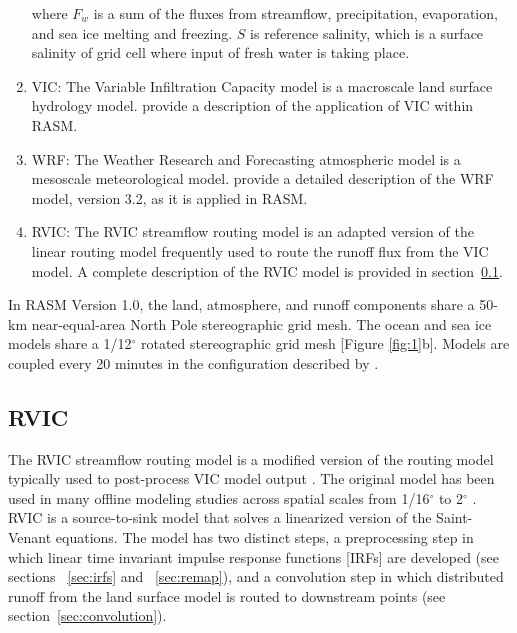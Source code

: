 \documentclass[jgrga, draft]{agutex}
\begin{document}
\begin{article}
\begin{enumerate}
where $F_w$ is a sum of the fluxes from streamflow, precipitation, evaporation, and sea ice melting and freezing. $S$ is reference salinity, which is a surface salinity of grid cell where input of fresh water is taking place.

\item VIC: The Variable Infiltration Capacity model \citep{Liang_1994} is a macroscale land surface hydrology model.
\citet{Hamman_2016} provide a description of the application of VIC within RASM.
\item WRF: The Weather Research and Forecasting atmospheric model \citep{Skamarock_2007} is a mesoscale meteorological model.
\citet{Cassano_2016} provide a detailed description of the WRF model, version 3.2, as it is applied in RASM.
\item RVIC: The RVIC streamflow routing model is an adapted version of the \citet{Lohmann_1996} linear routing model frequently used to route the runoff flux from the VIC model.
A complete description of the RVIC model is provided in section~\ref{sec:rvic}.
\end{enumerate}

In RASM Version 1.0, the land, atmosphere, and runoff components share a 50-km near-equal-area North Pole stereographic grid mesh.
The ocean and sea ice models share a 1/12$^{\circ}$ rotated stereographic grid mesh [Figure \ref{fig:1}b].
Models are coupled every 20 minutes in the configuration described by \citet{Roberts_2015a}.

\subsection{RVIC}
\label{sec:rvic}

The RVIC streamflow routing model is a modified version of the routing model typically used to post-process VIC model output \citep{Lohmann_1996, Lohmann_1998a}.
The original \citet{Lohmann_1996} model has been used in many offline modeling studies across spatial scales from 1/16$^{\circ}$ to 2$^{\circ}$ \citep[e.g.][]{Nijssen_1997,Lohmann_1998b,Su_2005}.
RVIC is a source-to-sink model that solves a linearized version of the Saint-Venant equations.
The model has two distinct steps, a preprocessing step in which linear time invariant impulse response functions [IRFs] are developed (see sections ~\ref{sec:irfs} and ~\ref{sec:remap}), and a  convolution step in which distributed runoff from the land surface model is routed to downstream points (see section~\ref{sec:convolution}).


\end{article}
\end{document}
